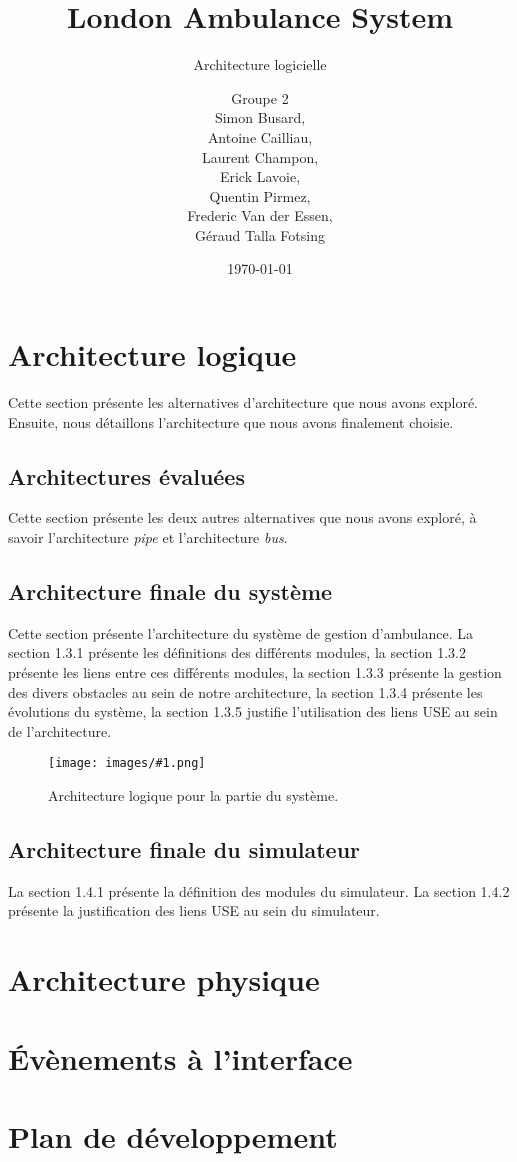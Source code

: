 \documentclass{report}
\title{London Ambulance System}
\subtitle{Architecture logicielle}
\author{\normalsize{Groupe 2}\\
\footnotesize{
Simon Busard, \\
Antoine Cailliau, \\
Laurent Champon,\\
Erick Lavoie, \\
Quentin Pirmez,\\
Frederic Van der Essen, \\
Géraud Talla Fotsing}}
\date{\today}
\newlength{\realtextwidth}
\newcommand{\insertfiguremargin}[2]{
	\begin{figure}[!h]
	\noindent\begin{minipage}[!h]{\marginparsep+\marginparwidth+\marginparpush+\textwidth}
		\begin{minipage}[t]{\realtextwidth}
			\vspace{0pt}
			\texttt{[image: images/\#1.png]}
		\end{minipage}
		\hspace{\marginparsep}
		\begin{minipage}[t]{\marginparwidth+\marginparpush}
			\vspace{0pt}
			\setcaptionwidth{\marginparwidth+\marginparpush}
			\caption{#2}\label{fig:#1}
			\setcaptionwidth{0.9\realtextwidth}
		\end{minipage}		
	\end{minipage}
	\end{figure}

}
\begin{document}
\setlength{\parskip}{1em}
\startdocument

\maketitle
\setcounter{tocdepth}{1}
\tableofcontents

\chapter{Architecture logique}
	
	Cette section présente les alternatives d'architecture que nous
	avons exploré. Ensuite, nous détaillons l'architecture que nous
	avons finalement choisie.

	\section{Architectures évaluées }
		
		Cette section présente les deux autres alternatives que nous 
		avons exploré, à savoir l'architecture \textit{pipe} et l'architecture
		\textit{bus}.
	
		
		
	
	\section{Architecture finale du système}
		Cette section présente l'architecture du système de gestion d'ambulance.
		La section 1.3.1 présente les définitions des différents modules, 
		la section 1.3.2 présente les liens entre ces différents modules, 
		la section 1.3.3 présente la gestion des divers obstacles au sein 
		de notre architecture, la section 1.3.4 présente les évolutions du 
		système, la section 1.3.5 justifie l'utilisation des liens USE au sein
		de l'architecture. 
	
		\insertfiguremargin{logic-sys}{Architecture logique pour la partie du 
		système.}
		
		
		
	\section{Architecture finale du simulateur}	
		La section 1.4.1 présente la définition
		des modules du simulateur. La section 1.4.2 présente la 
		justification des liens USE au sein du simulateur.	
		
		
		
		
\chapter{Architecture physique}
	

\chapter{Évènements à l'interface}
	

\chapter{Plan de développement}
	
\end{document}
